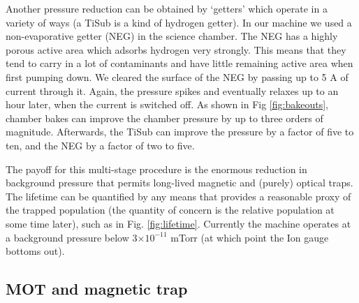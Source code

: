	Another pressure reduction can be obtained by `getters' which operate in a variety of ways (a TiSub is a kind of hydrogen getter).
	In our machine we used a non-evaporative getter (NEG) in the science chamber.
	The NEG has a highly porous active area which adsorbs hydrogen very strongly.
	This means that they tend to carry in a lot of contaminants and have little remaining active area when first pumping down.
	We cleared the surface of the NEG by passing up to 5 A of current through it.
	Again, the pressure spikes and eventually relaxes up to an hour later, when the current is switched off.
	As shown in Fig \ref{fig:bakeouts}, chamber bakes can improve the chamber pressure by up to three orders of magnitude.
	Afterwards, the TiSub can improve the pressure by a factor of five to ten, and the NEG by a factor of two to five.
		
	The payoff for this multi-stage procedure is the enormous reduction in background pressure that permits long-lived magnetic and (purely) optical traps.
	The lifetime can be quantified by any means that provides a reasonable proxy of the trapped population (the quantity of concern is the relative population at some time later), such as in Fig.	\ref{fig:lifetime}.
	Currently the machine operates at a background pressure below 3$\times10^{-11}$ mTorr (at which point the Ion gauge bottoms out).
		






\subsection{MOT and magnetic trap}
\label{sec:new_optics}

